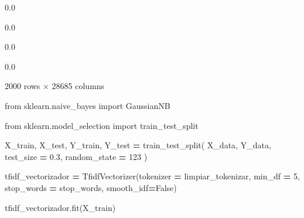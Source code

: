 \documentclass[
  11pt,
  a4paper,
]{article}
\newenvironment{Shaded}{\begin{snugshade}}{\end{snugshade}}
\newcommand{\DecValTok}[1]{\textcolor[rgb]{0.00,0.00,0.81}{#1}}
\newcommand{\FloatTok}[1]{\textcolor[rgb]{0.00,0.00,0.81}{#1}}
\newcommand{\ImportTok}[1]{#1}
\newcommand{\NormalTok}[1]{#1}
\newcommand{\OperatorTok}[1]{\textcolor[rgb]{0.81,0.36,0.00}{\textbf{#1}}}
\newcommand{\VariableTok}[1]{\textcolor[rgb]{0.00,0.00,0.00}{#1}}
\begin{document}
0.0

0.0

0.0

0.0

2000 rows × 28685 columns

\begin{Shaded}
\begin{Highlighting}[]
\ImportTok{from}\NormalTok{ sklearn.naive\_bayes }\ImportTok{import}\NormalTok{ GaussianNB}
\end{Highlighting}
\end{Shaded}

\begin{Shaded}
\begin{Highlighting}[]
\ImportTok{from}\NormalTok{ sklearn.model\_selection }\ImportTok{import}\NormalTok{ train\_test\_split}
\end{Highlighting}
\end{Shaded}

\begin{Shaded}
\begin{Highlighting}[]
\NormalTok{X\_train, X\_test, Y\_train, Y\_test }\OperatorTok{=}\NormalTok{ train\_test\_split(}
\NormalTok{    X\_data,}
\NormalTok{    Y\_data,}
\NormalTok{    test\_size }\OperatorTok{=} \FloatTok{0.3}\NormalTok{,}
\NormalTok{    random\_state }\OperatorTok{=} \DecValTok{123}    
\NormalTok{)}
\end{Highlighting}
\end{Shaded}

\begin{Shaded}
\begin{Highlighting}[]
\NormalTok{tfidf\_vectorizador }\OperatorTok{=}\NormalTok{ TfidfVectorizer(tokenizer  }\OperatorTok{=}\NormalTok{ limpiar\_tokenizar, min\_df }\OperatorTok{=} \DecValTok{5}\NormalTok{, stop\_words }\OperatorTok{=}\NormalTok{ stop\_words, smooth\_idf}\OperatorTok{=}\VariableTok{False}\NormalTok{)}
\end{Highlighting}
\end{Shaded}

\begin{Shaded}
\begin{Highlighting}[]
\NormalTok{tfidf\_vectorizador.fit(X\_train)}
\end{Highlighting}
\end{Shaded}
\end{document}
